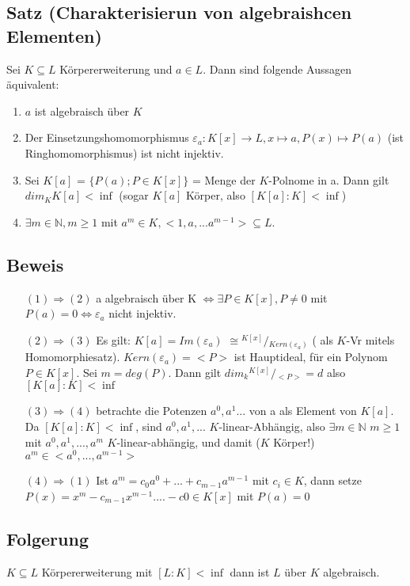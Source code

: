 \documentclass[12pt,a4paper,ngerman]{scrreprt}
\newcommand{\modulus}[2]{{}^{#1} \!/\!_{#2}}
\begin{document}
\subsection{Satz (Charakterisierun von algebraishcen Elementen)}
Sei $K \subseteq L$ Körpererweiterung und $a \in L$. Dann sind folgende Aussagen äquivalent:
\begin{enumerate}[(1)]
\item $a$ ist algebraisch über $K$
\item Der Einsetzungshomomorphismus $\varepsilon_a : K[x] \to L, x \mapsto a, P(x) \mapsto P(a)$
(ist Ringhomomorphismus) ist nicht injektiv.
\item Sei $K[a]$ = $\{P(a) ; P \in K[x]\}$ = Menge der $K$-Polnome in a. Dann gilt $dim_K K[a] < \inf$
(sogar $K[a]$ Körper, also $[K[a]:K] < \inf$)
\item $\exists m \in \mathbb{N}, m \geq 1$ mit $a^m \in K, <1,a, ... a^{m-1}> \subseteq L$.
\end{enumerate}

\subsection{Beweis}
\begin{enumerate}[]
\item[$(1) \Rightarrow (2)$] a algebraisch über K $\Leftrightarrow \exists P \in K[x], P \neq 0$
mit $P(a) = 0 \Leftrightarrow \varepsilon_a$ nicht injektiv.
\item[$(2) \Rightarrow (3)$] Es gilt: $K[a] = Im(\varepsilon_a)$
$\cong \modulus{K[x]}{Kern(\varepsilon_a)}$
( als $K$-Vr mitels Homomorphiesatz). $Kern(\varepsilon_a) = <P>$ ist Hauptideal, 
für ein Polynom $P \in K[x]$. Sei $m = deg(P)$.
Dann gilt $dim_k \modulus{K[x]}{<P>} = d$ also $[K[a]:K] < \inf$
\item[$(3) \Rightarrow (4)$] betrachte die Potenzen $a^0, a^1 ...$ von a als Element von $K[a]$.
Da $[K[a]:K] < \inf$, sind $a^0, a^1, ...$ $K$-linear-Abhängig, also $\exists m \in \mathbb{N}$
$ m \geq 1$ mit $a^0, a^1, ... , a^m$ $K$-linear-abhängig, und damit ($K$ Körper!)
$a^m \in <a^0, ... , a^{m-1}>$
\item[$(4) \Rightarrow (1)$] Ist $a^m = c_0 a^0 + ... + c_{m-1} a^{m-1}$ mit $c_i \in K$,
dann setze $P(x) = x^m - c_{m-1} x^{m-1} .... - c0 \in K[x]$ mit $P(a) = 0$
\end{enumerate}

\subsection{Folgerung}
$K \subseteq L$ Körpererweiterung mit $[L:K] < \inf$ dann ist $L$ über $K$ algebraisch.
\end{document}
